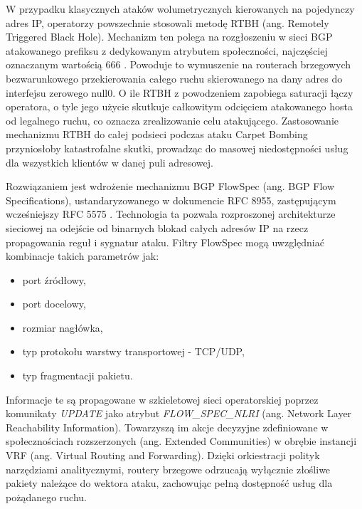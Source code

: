 \documentclass[a4paper,12pt]{article}
\begin{document}
W przypadku klasycznych ataków wolumetrycznych kierowanych na pojedynczy adres IP, operatorzy powszechnie stosowali metodę RTBH (ang. Remotely Triggered Black Hole). Mechanizm ten polega na rozgłoszeniu w sieci BGP atakowanego prefiksu z dedykowanym atrybutem społeczności, najczęściej oznaczanym wartością 666 \cite{rfc7999}. Powoduje to wymuszenie na routerach brzegowych bezwarunkowego przekierowania całego ruchu skierowanego na dany adres do interfejsu zerowego null0. O ile RTBH z powodzeniem zapobiega saturacji łączy operatora, o tyle jego użycie skutkuje całkowitym odcięciem atakowanego hosta od legalnego ruchu, co oznacza zrealizowanie celu atakującego. Zastosowanie mechanizmu RTBH do całej podsieci podczas ataku Carpet Bombing przyniosłoby katastrofalne skutki, prowadząc do masowej niedostępności usług dla wszystkich klientów w danej puli adresowej.

Rozwiązaniem jest wdrożenie mechanizmu BGP FlowSpec (ang. BGP Flow Specifications), ustandaryzowanego w dokumencie RFC 8955, zastępującym wcześniejszy RFC 5575 \cite{rfc8955}. Technologia ta pozwala rozproszonej architekturze sieciowej na odejście od binarnych blokad całych adresów IP na rzecz propagowania reguł i sygnatur ataku. Filtry FlowSpec mogą uwzględniać kombinacje takich parametrów jak:
\begin{itemize}
    \item port źródłowy,
    \item port docelowy,
    \item rozmiar nagłówka,
    \item typ protokołu warstwy transportowej - TCP/UDP,
    \item typ fragmentacji pakietu.
\end{itemize}
Informacje te są propagowane w szkieletowej sieci operatorskiej poprzez komunikaty \textit{UPDATE} jako atrybut \textit{FLOW\_SPEC\_NLRI} (ang. Network Layer Reachability Information). Towarzyszą im akcje decyzyjne zdefiniowane w społecznościach rozszerzonych (ang. Extended Communities) w obrębie instancji VRF (ang. Virtual Routing and Forwarding). Dzięki orkiestracji polityk narzędziami analitycznymi, routery brzegowe odrzucają wyłącznie złośliwe pakiety należące do wektora ataku, zachowując pełną dostępność usług dla pożądanego ruchu.
\end{document}
